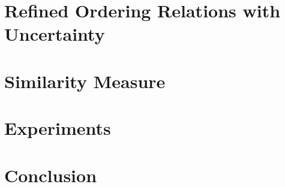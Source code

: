 \documentclass{llncs}
\begin{document}
\section{Refined Ordering Relations with Uncertainty}\label{sec:relations}

\section{Similarity Measure}\label{sec:similarity}

\section{Experiments}\label{sec:experiments}

\section{Conclusion}\label{sec:conclusion}




\end{document}
